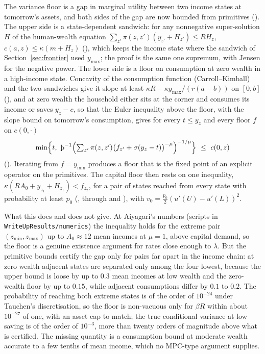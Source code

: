 The variance floor is a gap in marginal utility between two income states at tomorrow's assets,
and both sides of the gap are now bounded from primitives ().
The upper side is a state-dependent sandwich: for any nonnegative super-solution $H$ of the
human-wealth equation $\sum_{z'}\pi(z,z')(y_{z'}+H_{z'})\le RH_z$,
$c(a,z)\le\kappa(m+H_z)$ (), which keeps the
income state where the sandwich of Section~\ref{sec:frontier} used $y_{\max}$; the proof is the
same one supremum, with Jensen for the negative power. The lower side is a floor on consumption at
zero wealth in a high-income state. Concavity of the consumption function (Carroll--Kimball) and
the two sandwiches give it slope at least $\kappa R-\kappa y_{\max}/(r(\bar a-b))$ on $[0,b]$
(), and at zero wealth the household either sits at the corner
and consumes its income or saves $y_z-c$, so that the Euler inequality above the floor, with the
slope bound on tomorrow's consumption, gives for every $t\le y_z$ and every floor $f$ on
$c(0,\cdot)$
\[
  \min\Bigl\{t,\ \Thorn^{-1}\Bigl(\textstyle\sum_{z'}\pi(z,z')\bigl(f_{z'}+\sigma(y_z-t)\bigr)^{-\mu}\Bigr)^{-1/\mu}\Bigr\}
  \ \le\ c(0,z)
\]
(). Iterating from $f=y_{\min}$ produces a floor that is the
fixed point of an explicit operator on the primitives. The capital floor then rests on one
inequality, $\kappa(RA_0+y_{z_1}+H_{z_1})<f_{z_2}$, for a pair of states reached from every state
with probability at least $p_0$ (, through
 and ), with
$v_0=\tfrac{p_0}{2}(u'(U)-u'(L))^2$.

What this does and does not give. At Aiyagari's numbers (scripts in
\texttt{WriteUpResults/\allowbreak numerics}) the inequality holds for the extreme pair
$(z_{\min},z_{\max})$ up to $A_0\approx12$ mean incomes at $\mu=1$, above capital demand, so the
floor is a genuine existence argument for rates close enough to $\lambda$. But the primitive
bounds certify the gap only for pairs far apart in the income chain: at zero wealth adjacent
states are separated only among the four lowest, because the upper bound is loose by up to $0.3$
mean incomes at low wealth and the zero-wealth floor by up to $0.15$, while adjacent consumptions
differ by $0.1$ to $0.2$. The probability of reaching both extreme states is of the order of
$10^{-24}$ under Tauchen's discretisation, so the floor is non-vacuous only for $\beta R$ within
about $10^{-27}$ of one, with an asset cap to match; the true conditional variance at low saving
is of the order of $10^{-3}$, more than twenty orders of magnitude above what is certified. The
missing quantity is a consumption bound at moderate wealth accurate to a few tenths of mean
income, which no MPC-type argument supplies.

